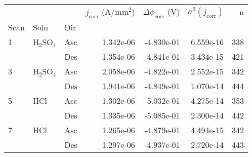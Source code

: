 \begin{tabular}{lllrrrr}
\toprule
  &     &     &  $j_{\text{corr}}$ (A/mm$^2$) &  $\Delta \phi_{\text{corr}}$ (V) &  $\sigma^2(j_{\text{corr}})$ &    n \\
Scan & Soln & Dir &                               &                                  &                              &      \\
\midrule
1 & H$_2$SO$_4$ & Asc &                     1.342e-06 &                       -4.830e-01 &                    6.559e-16 &  338 \\
  &     & Des &                     1.354e-06 &                       -4.841e-01 &                    3.434e-15 &  421 \\
3 & H$_2$SO$_4$ & Asc &                     2.058e-06 &                       -4.822e-01 &                    2.552e-15 &  342 \\
  &     & Des &                     1.941e-06 &                       -4.849e-01 &                    1.070e-14 &  444 \\
5 & HCl & Asc &                     1.302e-06 &                       -5.032e-01 &                    4.275e-14 &  353 \\
  &     & Des &                     1.335e-06 &                       -5.085e-01 &                    2.300e-14 &  442 \\
7 & HCl & Asc &                     1.265e-06 &                       -4.879e-01 &                    4.494e-15 &  342 \\
  &     & Des &                     1.297e-06 &                       -4.937e-01 &                    2.720e-14 &  443 \\
\bottomrule
\end{tabular}
